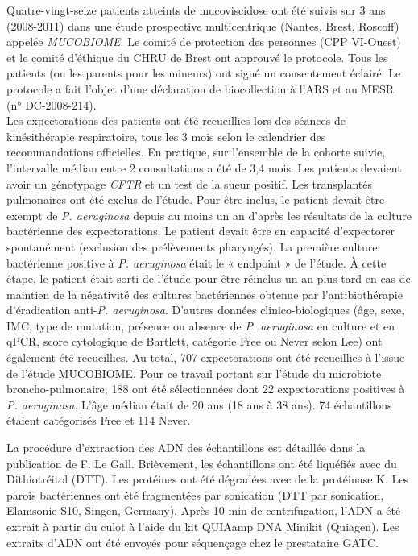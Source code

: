 \documentclass[12pt,a4paper]{article}
\begin{document}
Quatre-vingt-seize patients atteints de mucoviscidose ont été suivis sur 3 ans (2008-2011) dans une étude prospective multicentrique (Nantes, Brest, Roscoff) appelée \textit{MUCOBIOME}.
Le comité de protection des personnes (CPP VI-Ouest) et le comité d’éthique du CHRU de Brest ont approuvé le protocole. Tous les patients (ou les parents pour les mineurs) ont signé un consentement éclairé. Le protocole a fait l’objet d’une déclaration de biocollection à l’ARS et au MESR (n° DC-2008-214).\\
Les expectorations des patients ont été recueillies lors des séances de kinésithérapie respiratoire, tous les 3 mois selon le calendrier des recommandations officielles. En pratique, sur l’ensemble de la cohorte suivie, l’intervalle médian entre 2 consultations a été de 3,4 mois.
Les patients devaient avoir un génotypage \textit{CFTR} et un test de la sueur positif. Les transplantés pulmonaires ont été exclus de l’étude.
Pour être inclus, le patient devait être exempt de \textit{P. aeruginosa} depuis au moins un an d’après les résultats de la culture bactérienne des expectorations. Le patient devait être en capacité d’expectorer spontanément (exclusion des prélèvements pharyngés).
La première culture bactérienne positive à \textit{P. aeruginosa} était le « endpoint » de l’étude. À cette étape, le patient était sorti de l’étude pour être réinclus un an plus tard en cas de maintien de la négativité des cultures bactériennes obtenue par l’antibiothérapie d’éradication anti-\textit{P. aeruginosa}. D’autres données clinico-biologiques (âge, sexe, IMC, type de mutation, présence ou absence de \textit{P. aeruginosa} en culture et en qPCR, score cytologique de Bartlett, catégorie Free ou Never selon Lee\cite{Lee2003}) ont également été recueillies. Au total, 707 expectorations ont été recueillies à l’issue de l’étude MUCOBIOME. Pour ce travail portant sur l’étude du microbiote broncho-pulmonaire, 188 ont été sélectionnées dont 22 expectorations positives à \textit{P. aeruginosa}. L'âge médian était de 20 ans (18 ans à 38 ans). 74 échantillons étaient catégorisés Free et 114 Never.



La procédure d'extraction des ADN des échantillons est détaillée dans la publication de  F. Le Gall\cite{LeGall}. Brièvement, les échantillons ont été liquéfiés avec du Dithiotréitol (DTT). Les protéines ont été dégradées avec de la protéinase K.
Les parois bactériennes ont été fragmentées par sonication (DTT par sonication, Elamsonic S10, Singen, Germany). Après 10 min de centrifugation, l’ADN a été extrait à partir du culot à l'aide du kit QUIAamp DNA Minikit (Quiagen).
Les extraits d’ADN ont été envoyés pour séquençage chez le prestataire GATC.
\end{document}
